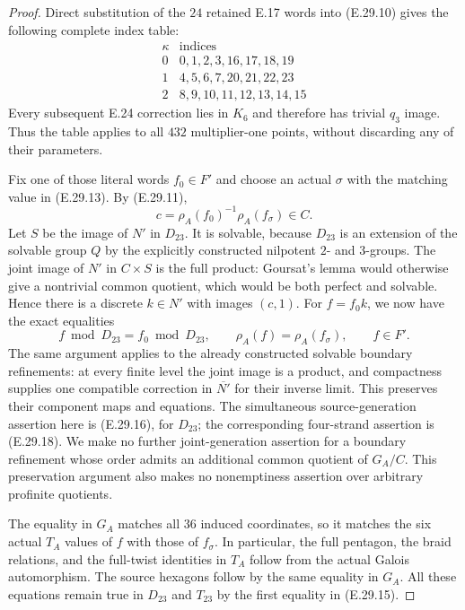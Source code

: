 \begin{proof}
Direct substitution of the $24$ retained E.17 words into
(E.29.10) gives the following complete index table:
\[
 \begin{array}{c|l}
 \kappa&\text{indices}\\\hline
 0&0,1,2,3,16,17,18,19\\
 1&4,5,6,7,20,21,22,23\\
 2&8,9,10,11,12,13,14,15
 \end{array}
 \tag{E.29.13}
\]
Every subsequent E.24 correction lies in $K_6$ and
therefore has trivial $q_3$ image. Thus the table applies
to all $432$ multiplier-one points, without discarding
any of their parameters.

Fix one of those literal words $f_0\in F'$ and choose
an actual $\sigma$ with the matching value in
(E.29.13). By (E.29.11),
\[
 c=\rho_A(f_0)^{-1}\rho_A(f_\sigma)\in C.
 \tag{E.29.14}
\]
Let $S$ be the image of $N'$ in $D_{23}$. It is
solvable, because $D_{23}$ is an extension of the
solvable group $Q$ by the explicitly constructed
nilpotent $2$- and $3$-groups. The joint image of $N'$
in $C\times S$ is the full product: Goursat's lemma
would otherwise give a nontrivial common quotient,
which would be both perfect and solvable. Hence
there is a discrete $k\in N'$ with images $(c,1)$.
For $f=f_0k$, we now have the exact equalities
\[
 f\bmod D_{23}=f_0\bmod D_{23},\qquad
 \rho_A(f)=\rho_A(f_\sigma),\qquad f\in F'.
 \tag{E.29.15}
\]
The same argument applies to the already constructed
solvable boundary refinements: at every finite level
the joint image is a product, and compactness supplies
one compatible correction in $\overline{N'}$ for their
inverse limit. This preserves their component maps and
equations. The simultaneous source-generation assertion
here is (E.29.16), for $D_{23}$; the corresponding
four-strand assertion is (E.29.18). We make no further
joint-generation assertion for a boundary refinement
whose order admits an additional common quotient of
$G_A/C$. This preservation argument also makes no
nonemptiness assertion over arbitrary profinite quotients.

The equality in $G_A$ matches all $36$ induced coordinates,
so it matches the six actual $T_A$ values of $f$ with
those of $f_\sigma$. In particular, the full pentagon,
the braid relations, and the full-twist identities in
$T_A$ follow from the actual Galois automorphism.
The source hexagons follow by the same equality in
$G_A$. All these equations remain true in $D_{23}$ and
$T_{23}$ by the first equality in (E.29.15).


\end{proof}
